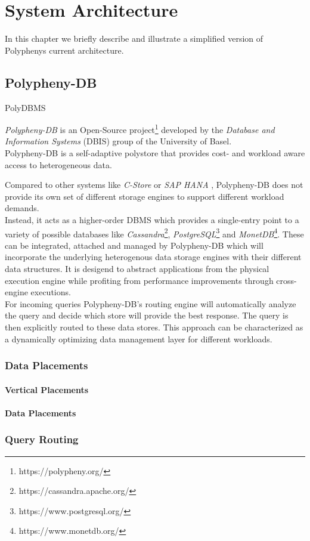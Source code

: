 \chapter{System Architecture}
\label{c:architecture}

In this chapter we briefly describe and illustrate a simplified version of Polyphenys current architecture.\\


\section{Polypheny-DB}
PolyDBMS \cite{polypheny2021}

\textit{Polypheny-DB} is an Open-Source project\footnote{https://polypheny.org/} developed by 
the \textit{Database and Information Systems} (DBIS) group of the University of Basel.\\

Polypheny-DB is a self-adaptive polystore that provides cost- and workload aware access to heterogeneous data\cite{poly2020}.

Compared to other systems like \textit{C-Store}\cite{cstore_2005} or \textit{SAP HANA} \cite{hana_2012}, 
Polypheny-DB does not provide its own set of different storage engines to support 
different workload demands.\\
Instead, it acts as a higher-order DBMS which provides a single-entry point to 
a variety of possible databases like 
\textit{Cassandra}\footnote{https://cassandra.apache.org/}, 
\textit{PostgreSQL}\footnote{https://www.postgresql.org/} 
and \textit{MonetDB}\footnote{https://www.monetdb.org/}. 
These can be integrated, attached and managed by Polypheny-DB which will incorporate the underlying 
heterogenous data storage engines with their different data structures. It is 
desigend to abstract applications from the physical execution engine while profiting from 
performance improvements through cross-engine executions. 
\\
For incoming queries Polypheny-DB's routing engine will automatically analyze the query and decide 
which store will provide the best response. The query is then explicitly routed to these data stores. 
This approach can be characterized as a dynamically optimizing data management layer for different workloads.

\subsection{Data Placements}
\subsubsection{Vertical Placements}
\subsubsection{Data Placements}

\subsection{Query Routing}


